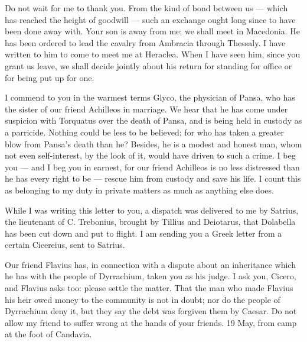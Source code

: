 

 Do not wait for me to thank you. From the kind of bond between us --- which has reached the height of goodwill --- such an exchange ought long since to have been done away with. Your son is away from me; we shall meet in Macedonia. He has been ordered to lead the cavalry from Ambracia through Thessaly. I have written to him to come to meet me at Heraclea. When I have seen him, since you grant us leave, we shall decide jointly about his return for standing for office or for being put up for one.

 I commend to you in the warmest terms Glyco, the physician of Pansa, who has the sister of our friend Achilleos in marriage. We hear that he has come under suspicion with Torquatus over the death of Pansa, and is being held in custody as a parricide. Nothing could be less to be believed; for who has taken a greater blow from Pansa's death than he? Besides, he is a modest and honest man, whom not even self-interest, by the look of it, would have driven to such a crime. I beg you --- and I beg you in earnest, for our friend Achilleos is no less distressed than he has every right to be --- rescue him from custody and save his life. I count this as belonging to my duty in private matters as much as anything else does.

 While I was writing this letter to you, a dispatch was delivered to me by Satrius, the lieutenant of C. Trebonius, brought by Tillius and Deiotarus, that Dolabella has been cut down and put to flight. I am sending you a Greek letter from a certain Cicereius, sent to Satrius.

 Our friend Flavius has, in connection with a dispute about an inheritance which he has with the people of Dyrrachium, taken you as his judge. I ask you, Cicero, and Flavius asks too: please settle the matter. That the man who made Flavius his heir owed money to the community is not in doubt; nor do the people of Dyrrachium deny it, but they say the debt was forgiven them by Caesar. Do not allow my friend to suffer wrong at the hands of your friends. 19 May, from camp at the foot of Candavia.
